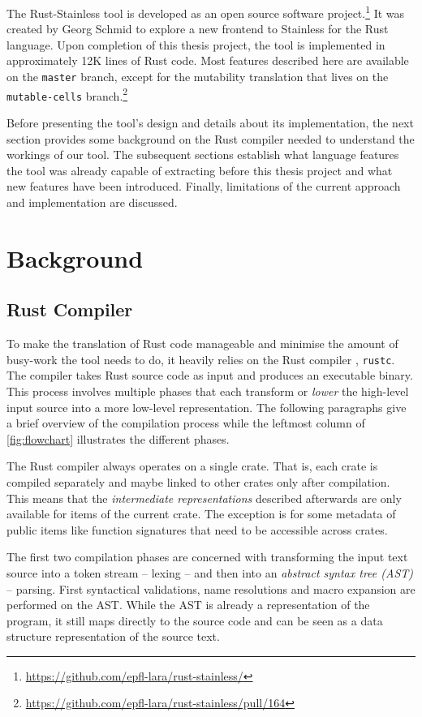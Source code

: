 The Rust-Stainless tool is developed as an open source software
project.\footnote{\url{https://github.com/epfl-lara/rust-stainless/}} It was
created by Georg Schmid to explore a new frontend to Stainless for the Rust
language. Upon completion of this thesis project, the tool is implemented in
approximately 12K lines of Rust code. Most features described here are available
on the \lstinline!master! branch, except for the mutability translation that
lives on the \lstinline!mutable-cells!
branch.\footnote{\url{https://github.com/epfl-lara/rust-stainless/pull/164}}

Before presenting the tool's design and details about its implementation, the
next section provides some background on the Rust compiler needed to understand
the workings of our tool. The subsequent sections establish what language
features the tool was already capable of extracting before this thesis project
and what new features have been introduced. Finally, limitations of the current
approach and implementation are discussed.


\section{Background}

\subsection{Rust Compiler}

To make the translation of Rust code manageable and minimise the amount of
busy-work the tool needs to do, it heavily relies on the Rust compiler
\cite{rustc-guide}, \passthrough{\lstinline!rustc!}. The compiler takes Rust
source code as input and produces an executable binary. This process involves
multiple phases that each transform or \emph{lower} the high-level input source
into a more low-level representation. The following paragraphs give  a brief
overview of the compilation process while the leftmost column of
\autoref{fig:flowchart} illustrates the different phases.

The Rust compiler always operates on a single crate. That is, each crate is
compiled separately and maybe linked to other crates only after compilation.
This means that the \emph{intermediate representations} described afterwards are
only available for items of the current crate. The exception is for some
metadata of public items like function signatures that need to be accessible
across crates.

The first two compilation phases are concerned with transforming the input text
source into a token stream -- lexing -- and then into an \emph{abstract syntax
tree (AST)} -- parsing. First syntactical validations, name resolutions and
macro expansion are performed on the AST. While the AST is already a
representation of the program, it still maps directly to the source code and can
be seen as a data structure representation of the source text.

